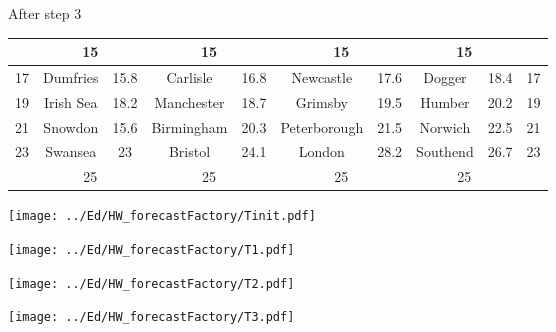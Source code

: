 \begin{slide}{}
\begin{minipage}{0.15\linewidth}\raggedright
After step 3\end{minipage}
\begin{tabular}{c|cc|cc|cc|cc|c}
&\multicolumn{2}{c|}{15}&\multicolumn{2}{c|}{15}&\multicolumn{2}{c|}{15}&\multicolumn{2}{c|}{15} \\
\hline 17 & Dumfries & 15.8 & Carlisle  & 16.8 & Newcastle & 17.6 & Dogger & 18.4&17\\
\hline 19 & Irish Sea & 18.2 & Manchester & 18.7 & Grimsby & 19.5 & Humber & 20.2 &19\\
\hline 21 & Snowdon & 15.6 & Birmingham & 20.3 & Peterborough & 21.5 & Norwich & 22.5 &21\\
\hline 23 & Swansea & 23 & Bristol & 24.1 & London & 28.2 & Southend & 26.7 & 23\\ \hline
&\multicolumn{2}{c|}{25}&\multicolumn{2}{c|}{25}&\multicolumn{2}{c|}{25}&\multicolumn{2}{c|}{25}
\end{tabular}

\end{slide}

\begin{slide}{}
{\centering
\texttt{[image: ../Ed/HW\_forecastFactory/Tinit.pdf]}
}
\end{slide}

\begin{slide}{}
{\centering
\texttt{[image: ../Ed/HW\_forecastFactory/T1.pdf]}
}
\end{slide}

\begin{slide}{}
{\centering
\texttt{[image: ../Ed/HW\_forecastFactory/T2.pdf]}
}
\end{slide}

\begin{slide}{}
{\centering
\texttt{[image: ../Ed/HW\_forecastFactory/T3.pdf]}
}
\end{slide}

